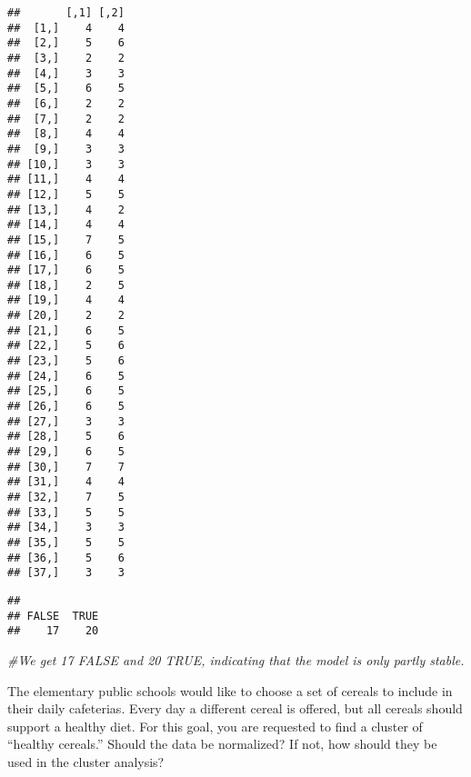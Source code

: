 \documentclass[
]{article}
\newenvironment{Shaded}{\begin{snugshade}}{\end{snugshade}}
\newcommand{\CommentTok}[1]{\textcolor[rgb]{0.56,0.35,0.01}{\textit{#1}}}
\newcommand{\DecValTok}[1]{\textcolor[rgb]{0.00,0.00,0.81}{#1}}
\newcommand{\FunctionTok}[1]{\textcolor[rgb]{0.00,0.00,0.00}{#1}}
\newcommand{\NormalTok}[1]{#1}
\newcommand{\SpecialCharTok}[1]{\textcolor[rgb]{0.00,0.00,0.00}{#1}}
\begin{document}
\begin{verbatim}
##       [,1] [,2]
##  [1,]    4    4
##  [2,]    5    6
##  [3,]    2    2
##  [4,]    3    3
##  [5,]    6    5
##  [6,]    2    2
##  [7,]    2    2
##  [8,]    4    4
##  [9,]    3    3
## [10,]    3    3
## [11,]    4    4
## [12,]    5    5
## [13,]    4    2
## [14,]    4    4
## [15,]    7    5
## [16,]    6    5
## [17,]    6    5
## [18,]    2    5
## [19,]    4    4
## [20,]    2    2
## [21,]    6    5
## [22,]    5    6
## [23,]    5    6
## [24,]    6    5
## [25,]    6    5
## [26,]    6    5
## [27,]    3    3
## [28,]    5    6
## [29,]    6    5
## [30,]    7    7
## [31,]    4    4
## [32,]    7    5
## [33,]    5    5
## [34,]    3    3
## [35,]    5    5
## [36,]    5    6
## [37,]    3    3
\end{verbatim}

\begin{Shaded}
\end{Shaded}

\begin{verbatim}
## 
## FALSE  TRUE 
##    17    20
\end{verbatim}

\begin{Shaded}
\begin{Highlighting}[]
\CommentTok{\#We get 17 FALSE and 20 TRUE, indicating that the model is only partly stable.}
\end{Highlighting}
\end{Shaded}

The elementary public schools would like to choose a set of cereals to
include in their daily cafeterias. Every day a different cereal is
offered, but all cereals should support a healthy diet. For this goal,
you are requested to find a cluster of ``healthy cereals.'' Should the
data be normalized? If not, how should they be used in the cluster
analysis?
\end{document}
